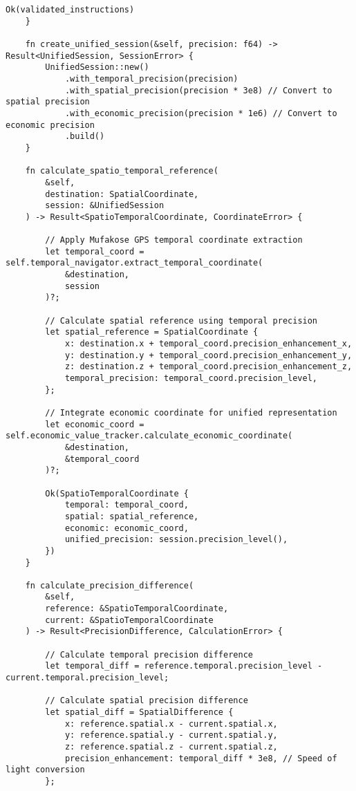 \documentclass[12pt,a4paper]{article}
\begin{document}
\begin{lstlisting}[style=ruststyle, caption=Spatio-Temporal Navigation Engine]
        Ok(validated_instructions)
    }
    
    fn create_unified_session(&self, precision: f64) -> Result<UnifiedSession, SessionError> {
        UnifiedSession::new()
            .with_temporal_precision(precision)
            .with_spatial_precision(precision * 3e8) // Convert to spatial precision
            .with_economic_precision(precision * 1e6) // Convert to economic precision
            .build()
    }
    
    fn calculate_spatio_temporal_reference(
        &self,
        destination: SpatialCoordinate,
        session: &UnifiedSession
    ) -> Result<SpatioTemporalCoordinate, CoordinateError> {
        
        // Apply Mufakose GPS temporal coordinate extraction
        let temporal_coord = self.temporal_navigator.extract_temporal_coordinate(
            &destination,
            session
        )?;
        
        // Calculate spatial reference using temporal precision
        let spatial_reference = SpatialCoordinate {
            x: destination.x + temporal_coord.precision_enhancement_x,
            y: destination.y + temporal_coord.precision_enhancement_y,
            z: destination.z + temporal_coord.precision_enhancement_z,
            temporal_precision: temporal_coord.precision_level,
        };
        
        // Integrate economic coordinate for unified representation
        let economic_coord = self.economic_value_tracker.calculate_economic_coordinate(
            &destination,
            &temporal_coord
        )?;
        
        Ok(SpatioTemporalCoordinate {
            temporal: temporal_coord,
            spatial: spatial_reference,
            economic: economic_coord,
            unified_precision: session.precision_level(),
        })
    }
    
    fn calculate_precision_difference(
        &self,
        reference: &SpatioTemporalCoordinate,
        current: &SpatioTemporalCoordinate
    ) -> Result<PrecisionDifference, CalculationError> {
        
        // Calculate temporal precision difference
        let temporal_diff = reference.temporal.precision_level - current.temporal.precision_level;
        
        // Calculate spatial precision difference
        let spatial_diff = SpatialDifference {
            x: reference.spatial.x - current.spatial.x,
            y: reference.spatial.y - current.spatial.y,
            z: reference.spatial.z - current.spatial.z,
            precision_enhancement: temporal_diff * 3e8, // Speed of light conversion
        };
        

\end{lstlisting}
\end{document}
